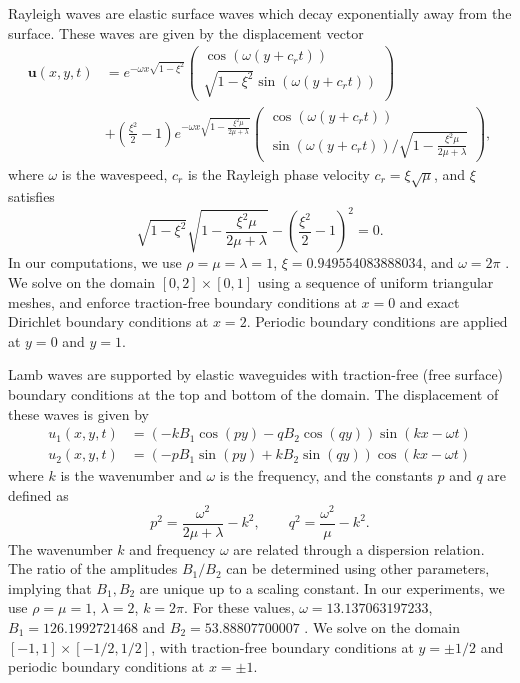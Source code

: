 \documentclass{siamart0216}
\newcommand{\LRp}[1]{\left( #1 \right)}
\begin{document}
Rayleigh waves are elastic surface waves which decay exponentially away from the surface.  These waves are given by the displacement vector
\begin{align*}
\bm{u}\LRp{x,y,t} &= e^{-\omega x \sqrt{1-\xi^2}}
\LRp{
\begin{array}{c}
\cos(\omega(y+c_r t)) \\
\sqrt{1-\xi^2}\sin(\omega(y+c_r t))
\end{array}
}\\
&+ \LRp{\frac{\xi^2}{2}-1}e^{-\omega x\sqrt{1-\frac{\xi^2\mu}{2\mu + \lambda}}}
\LRp{
\begin{array}{c}
\cos(\omega(y + c_r t))\\
{\sin(\omega(y+c_r t))}/{\sqrt{1-\frac{\xi^2\mu}{2\mu + \lambda}}}
\end{array}
},
\end{align*}
where $\omega$ is the wavespeed, $c_r$ is the Rayleigh phase velocity $c_r = \xi \sqrt{\mu}$, and $\xi$ satisfies
\[
\sqrt{1-\xi^2}\sqrt{1 - \frac{\xi^2\mu}{2\mu+\lambda}} - \LRp{\frac{\xi^2}{2}-1}^2 = 0.
\]
In our computations, we use $\rho = \mu = \lambda = 1$, $\xi = 0.949554083888034$, and $\omega = 2\pi$ \cite{wilcox2010high}.  We solve on the domain $[0,2]\times[0,1]$ using a sequence of uniform triangular meshes, and enforce traction-free boundary conditions at $x=0$ and exact Dirichlet boundary conditions at $x=2$.  Periodic boundary conditions are applied at $y = 0$ and $y = 1$.  

Lamb waves are supported by elastic waveguides with traction-free (free surface) boundary conditions at the top and bottom of the domain.  The displacement of these waves is given by
\begin{align*}
{u}_1\LRp{x,y,t} &= \LRp{-kB_1 \cos(p y)- qB_2 \cos(q y)} \sin(k x - \omega t)\\
{u}_2\LRp{x,y,t} &= \LRp{-pB_1 \sin(py) + kB_2 \sin(qy)} \cos(kx - \omega t)
\end{align*}
where $k$ is the wavenumber and $\omega$ is the frequency, and the constants $p$ and $q$ are defined as
\[
p^2 = \frac{\omega^2}{2\mu + \lambda} - k^2, \qquad q^2 = \frac{\omega^2}{\mu} - k^2.
\]
The wavenumber $k$ and frequency $\omega$ are related through a dispersion relation.  The ratio of the amplitudes $B_1/ B_2$ can be determined using other parameters, implying that $B_1, B_2$ are unique up to a scaling constant.  In our experiments, we use $\rho = \mu = 1$, $\lambda = 2$, $k = 2\pi$.  For these values, $\omega = 13.137063197233$, $B_1 = 126.1992721468$ and $B_2 = 53.88807700007$ \cite{wilcox2010high}.  We solve on the domain $[-1,1]\times[-1/2,1/2]$, with traction-free boundary conditions at $y = \pm 1/2$ and periodic boundary conditions at $x = \pm 1$.  
\end{document}
